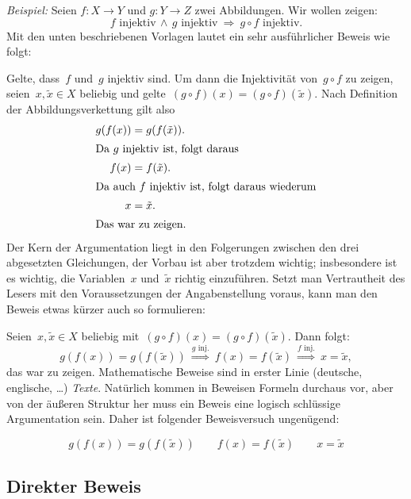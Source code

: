 \documentclass[12pt,a4paper,ngerman]{scrartcl}
\newenvironment{indentblock}{%
  \list{}{\leftmargin\leftmargin}%
  \item\relax
}{%
  \endlist
}
\theoremstyle{definition}
\theoremstyle{plain}
\theoremstyle{remark}
\begin{document}
\emph{Beispiel:} Seien $f: X \to Y$ und $g: Y \to Z$ zwei Abbildungen. Wir
wollen zeigen:
\[ \text{$f$ injektiv} \,\wedge\, \text{$g$ injektiv} \ \Longrightarrow\ 
  \text{$g \circ f$ injektiv}. \]
Mit den unten beschriebenen Vorlagen lautet ein sehr ausführlicher Beweis wie
folgt:
\begin{indentblock}
Gelte, dass~$f$ und~$g$ injektiv sind. Um dann die Injektivität von~$g
\circ f$ zu zeigen, seien~$x, \tilde x \in X$
beliebig und gelte~$(g \circ f)(x) = (g \circ f)(\tilde x)$. Nach Definition
der Abbildungsverkettung gilt also
\begin{align*}g(f(x)) &= g(f(\tilde x)). \\
\intertext{Da $g$ injektiv ist, folgt daraus}
f(x) &= f(\tilde x). \\
\intertext{Da auch $f$ injektiv ist, folgt daraus wiederum}
x &= \tilde x. \\
\intertext{Das war zu zeigen.}\end{align*}
\end{indentblock}
\vspace{-2em}
Der Kern der Argumentation liegt in den Folgerungen zwischen den drei
abgesetzten Gleichungen, der Vorbau ist aber trotzdem wichtig; insbesondere ist
es wichtig, die Variablen~$x$ und~$\tilde x$ richtig einzuführen.
Setzt man Vertrautheit des Lesers mit den Voraussetzungen der
Angabenstellung voraus, kann man den Beweis etwas kürzer auch so formulieren:
\begin{indentblock}
Seien~$x, \tilde x \in X$ beliebig mit~$(g \circ f)(x) = (g \circ f)(\tilde
x)$. Dann folgt:
\[ g(f(x)) = g(f(\tilde x)) \ \stackrel{\text{$g$ inj.}}{\Longrightarrow}\ 
   f(x) = f(\tilde x) \ \stackrel{\text{$f$ inj.}}{\Longrightarrow}\ 
   x = \tilde x, \]
das war zu zeigen.
\end{indentblock}
Mathematische Beweise sind in erster Linie (deutsche, englische, \ldots)
\emph{Texte}. Natürlich kommen in Beweisen Formeln durchaus vor, aber von der
äußeren Struktur her muss ein Beweis eine logisch schlüssige Argumentation
sein. Daher ist folgender Beweisversuch ungenügend:
\begin{indentblock}
\[ g(f(x)) = g(f(\tilde x)) \qquad
   f(x) = f(\tilde x) \qquad
   x = \tilde x \]
\end{indentblock}

\newpage

\subsection*{Direkter Beweis}
\end{document}
